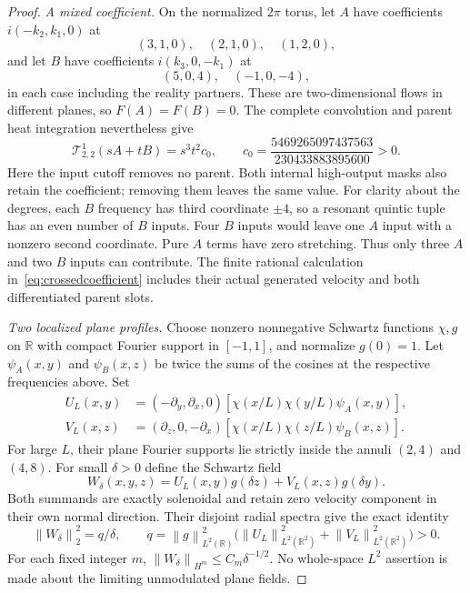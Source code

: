 \documentclass[11pt]{article}
\newcommand{\R}{\mathbb R}
\newcommand{\norm}[1]{\left\lVert#1\right\rVert}
\begin{document}
\begin{proof}
\emph{A mixed coefficient.}
On the normalized $2\pi$ torus, let $A$ have coefficients
$i(-k_2,k_1,0)$ at
\[
 (3,1,0),\quad(2,1,0),\quad(1,2,0),
\]
and let $B$ have coefficients $i(k_3,0,-k_1)$ at
\[
 (5,0,4),\quad(-1,0,-4),
\]
in each case including the reality partners. These are two-dimensional
flows in different planes, so $F(A)=F(B)=0$. The complete convolution
and parent heat integration nevertheless give
\begin{equation}\label{eq:crossedcoefficient}
 \mathcal T_{2,2}^1(sA+tB)=s^3t^2 c_0,\qquad
 c_0=\frac{5469265097437563}{230433883895600}>0.
\end{equation}
Here the input cutoff removes no parent. Both internal high-output
masks also retain the coefficient; removing them leaves the same value.
For clarity about the degrees, each $B$ frequency has third coordinate
$\pm4$, so a resonant quintic tuple has an even number of $B$ inputs.
Four $B$ inputs would leave one $A$ input with a nonzero second
coordinate. Pure $A$ terms have zero stretching. Thus only three $A$
and two $B$ inputs can contribute. The finite rational calculation
in~\eqref{eq:crossedcoefficient} includes their actual generated
velocity and both differentiated parent slots.

\emph{Two localized plane profiles.}
Choose nonzero nonnegative Schwartz functions $\chi,g$ on $\R$ with
compact Fourier support in $[-1,1]$, and normalize $g(0)=1$.
Let $\psi_A(x,y)$ and $\psi_B(x,z)$ be twice the sums of the cosines
at the respective frequencies above. Set
\begin{align*}
 U_L(x,y)&=(-\partial_y,\partial_x,0)
       [\chi(x/L)\chi(y/L)\psi_A(x,y)],\\
 V_L(x,z)&=(\partial_z,0,-\partial_x)
       [\chi(x/L)\chi(z/L)\psi_B(x,z)].
\end{align*}
For large $L$, their plane Fourier supports lie strictly inside
the annuli $(2,4)$ and $(4,8)$. For small $\delta>0$ define the
Schwartz field
\begin{equation}\label{eq:crossedprofile}
 W_\delta(x,y,z)=U_L(x,y)g(\delta z)+V_L(x,z)g(\delta y).
\end{equation}
Both summands are exactly solenoidal and retain zero velocity component
in their own normal direction. Their disjoint radial spectra give the
exact identity
\begin{equation}\label{eq:crossedenergy}
 \norm{W_\delta}_2^2=q/\delta,\qquad
 q=\norm g_{L^2(\R)}^2
   \bigl(\norm{U_L}_{L^2(\R^2)}^2+\norm{V_L}_{L^2(\R^2)}^2\bigr)>0.
\end{equation}
For each fixed integer $m$, $\norm{W_\delta}_{H^m}\leq C_m\delta^{-1/2}$.
No whole-space $L^2$ assertion is made about the limiting unmodulated
plane fields.


\end{proof}
\end{document}
